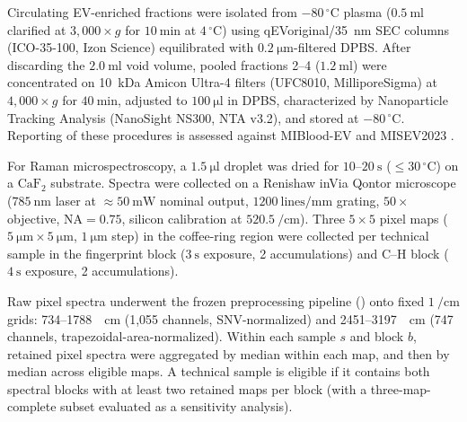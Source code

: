 \documentclass[preprint,12pt]{elsarticle}
\begin{document}
Circulating EV-enriched fractions were isolated from $-80\,^\circ\text{C}$ plasma ($0.5~\si{\milli\litre}$ clarified at $3{,}000 \times g$ for $10~\si{\minute}$ at $4\,^\circ\text{C}$) using qEVoriginal/35~nm SEC columns (ICO-35-100, Izon Science) equilibrated with $0.2~\si{\micro\metre}$-filtered DPBS. After discarding the $2.0~\si{\milli\litre}$ void volume, pooled fractions 2--4 ($1.2~\si{\milli\litre}$) were concentrated on 10~kDa Amicon Ultra-4 filters (UFC8010, MilliporeSigma) at $4{,}000 \times g$ for $40~\si{\minute}$, adjusted to $100~\si{\micro\litre}$ in DPBS, characterized by Nanoparticle Tracking Analysis (NanoSight NS300, NTA v3.2), and stored at $-80\,^\circ\text{C}$. Reporting of these procedures is assessed against MIBlood-EV and MISEV2023 \cite{lucien2023, welsh2024}.

For Raman microspectroscopy, a $1.5~\si{\micro\litre}$ droplet was dried for $10\text{--}20~\si{\second}$ ($\le 30\,^\circ\text{C}$) on a $\mathrm{CaF}_2$ substrate. Spectra were collected on a Renishaw inVia Qontor microscope ($785~\si{\nano\metre}$ laser at $\approx 50~\si{\milli\watt}$ nominal output, $1200~\text{lines/mm}$ grating, $50\times$ objective, $\mathrm{NA}=0.75$, silicon calibration at $520.5~\si{\per\centi\metre}$). Three $5 \times 5$ pixel maps ($5~\si{\micro\metre} \times 5~\si{\micro\metre}$, $1~\si{\micro\metre}$ step) in the coffee-ring region were collected per technical sample in the fingerprint block ($3~\si{\second}$ exposure, 2 accumulations) and C--H block ($4~\si{\second}$ exposure, 2 accumulations).

Raw pixel spectra underwent the frozen preprocessing pipeline () onto fixed $1~\si{\per\centi\metre}$ grids: 734--1788~\si{\per\centi\metre} (1,055 channels, SNV-normalized) and 2451--3197~\si{\per\centi\metre} (747 channels, trapezoidal-area-normalized). Within each sample $s$ and block $b$, retained pixel spectra were aggregated by median within each map, and then by median across eligible maps. A technical sample is eligible if it contains both spectral blocks with at least two retained maps per block (with a three-map-complete subset evaluated as a sensitivity analysis).
\end{document}
